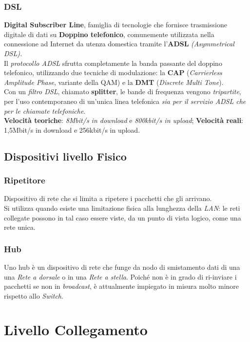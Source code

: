 \documentclass[a4paper,11pt]{article}
\begin{document}
\subsubsection{DSL}
\textbf{Digital Subscriber Line}, famiglia di tecnologie che fornisce trasmissione digitale di dati su \textbf{Doppino telefonico}, comunemente utilizzata nella connessione ad Internet da utenza domestica tramite l'\textbf{ADSL} \textit{(Asymmetrical DSL). }\\Il \textit{protocollo ADSL }sfrutta completamente la banda passante del doppino telefonico, utilizzando due tecniche di modulazione: la \textbf{CAP }(\textit{Carrierless Amplitude Phase}, variante della QAM) e la \textbf{DMT }(\textit{Discrete Multi Tone}).\\
Con un \textit{filtro DSL}, chiamato \textbf{splitter}, le bande di frequenza vengono \textit{tripartite}, per l'uso contemporaneo di un'unica linea telefonica \textit{sia per il servizio ADSL che per le chiamate telefoniche}.\\
\textbf{Velocità teoriche}: \textit{8Mbit/s in download} e\textit{ 800kbit/s in upload}; \textbf{Velocità reali}: 1,5Mbit/s in download e 256kbit/s in upload.
\subsection{Dispositivi livello Fisico}
\subsubsection{Ripetitore}
Dispositivo di rete che si limita a ripetere i pacchetti che gli arrivano.\\
Si utilizza quando esiste una limitazione fisica alla lunghezza della \textit{LAN}: le reti collegate possono in tal caso essere viste, da un punto di vista logico, come una rete unica.
\subsubsection{Hub} 
Uno hub è un dispositivo di rete che funge da nodo di smistamento dati di una una \textit{Rete a dorsale} o in una \textit{Rete a stella}. Poiché non è in grado di ri-inviare i pacchetti se non in \textit{broadcast}, è attualmente impiegato in misura molto minore rispetto allo \textit{Switch}.
\newpage
\section{Livello Collegamento}
\end{document}
